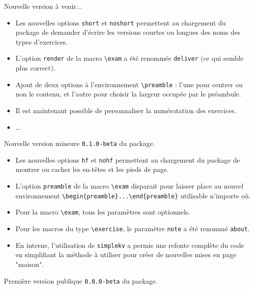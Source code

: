\documentclass[12pt,a4paper]{scrartcl}
\theoremstyle{definition}
\begin{document}
\begin{description}[leftmargin=1em]
	\setlength\itemsep{1em}

	\item[À SUIVRE !] Nouvelle version à venir...
	\begin{itemize}
        \item Les nouvelles options \verb+short+ et \verb+noshort+ permettent au chargement du package de demander d'écrire les versions courtes ou longues des noms des types d'exercices.

        \item L'option \verb+render+ de la macro \verb+\exam+ a été renommée \verb+deliver+ (ce qui semble plus correct).
        
        \item Ajout de deux options à l'environnement \verb+\preamble+ : l'une pour centrer ou non le contenu, et l'autre pour choisir la largeur occupée par le préambule.

        \item Il est maintenant possible de personnaliser la numérotation des exercices.


        \item \dots
	\end{itemize}

	\item[2017-11-12] Nouvelle version mineure \verb+0.1.0-beta+ du package.
	\begin{itemize}
        \item Les nouvelles options \verb+hf+ et \verb+nohf+ permettent au chargement du package de montrer ou cacher les en-têtes et les pieds de page.

        \item L'option \verb+preamble+ de la macro \verb+\exam+ disparait pour laisser place au nouvel environnement \verb+\begin{preamble}...\end{preamble}+ utilisable n'importe où.

        \item Pour la macro \verb+\exam+, tous les paramètres sont optionnels.

        \item Pour les macros du type \verb+\exercise+, le paramètre \verb+note+ a été renommé \verb+about+.

		\item En interne, l'utilisation de \verb+simplekv+ a permis une refonte complète du code en simplifiant la méthode à utiliser pour créer de nouvelles mises en page "maison".
	\end{itemize}

	\item[2017-11-03] Première version publique \verb+0.0.0-beta+ du package.
\end{description}
\end{document}
